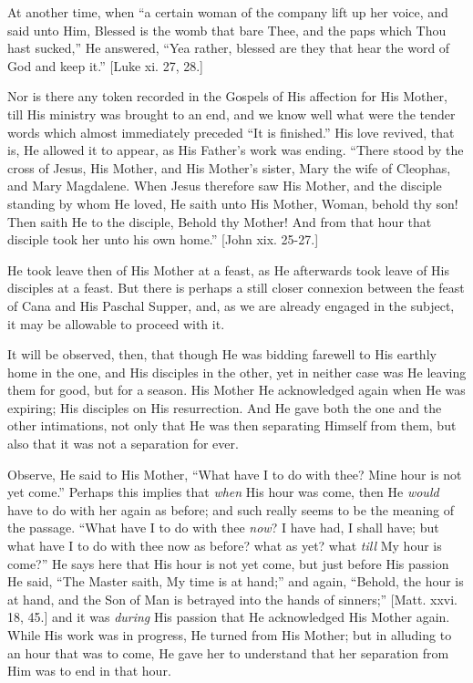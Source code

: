 At another time, when ``a certain woman of the company lift up
her voice, and said unto Him, Blessed is the womb that bare Thee, and
the paps which Thou hast sucked,'' He answered, ``Yea rather,
blessed are they that hear the word of God and keep it.'' [Luke xi.
27, 28.]

Nor is there any token recorded in the Gospels of His affection for
His Mother, till His ministry was brought to an end, and we know well
what were the tender words which almost immediately preceded ``It
is finished.'' His love revived, that is, He allowed it to appear,
as His Father's work was ending. ``There stood by the cross of
Jesus, His Mother, and His Mother's sister, Mary the wife of Cleophas,
and Mary Magdalene. When Jesus therefore saw His Mother, and the
disciple standing by whom He loved, He saith unto His Mother, Woman,
behold thy son! Then saith He to the disciple, Behold thy Mother! And
from that hour that disciple took her unto his own home.'' [John
xix. 25-27.]

He took leave then of His Mother at a feast, as He afterwards took
leave of His disciples at a feast. But there is perhaps a still closer
connexion between the feast of Cana and His Paschal Supper, and, as we
are already engaged in the subject, it may be allowable to proceed
with it.

It will be observed, then, that though He was bidding farewell to
His earthly home in the one, and His disciples in the other, yet in
neither case was He leaving them for good, but for a season. His
Mother He acknowledged again when He was expiring; His disciples on
His resurrection. And He gave both the one and the other intimations,
not only that He was then separating Himself from them, but also that
it was not a separation for ever.

Observe, He said to His Mother, ``What have I to do with thee?
Mine hour is not yet come.'' Perhaps this implies that \emph{when}
His hour was come, then He \emph{would} have to do with her again as
before; and such really seems to be the meaning of the passage.
``What have I to do with thee \emph{now}? I have had, I shall
have; but what have I to do with thee now as before? what as yet? what
\emph{till} My hour is come?'' He says here that His hour is not
yet come, but just before His passion He said, ``The Master saith,
My time is at hand;'' and again, ``Behold, the hour is at
hand, and the Son of Man is betrayed into the hands of sinners;''
[Matt. xxvi. 18, 45.] and it was \emph{during} His passion that He
acknowledged His Mother again. While His work was in progress, He
turned from His Mother; but in alluding to an hour that was to come,
He gave her to understand that her separation from Him was to end in
that hour.

